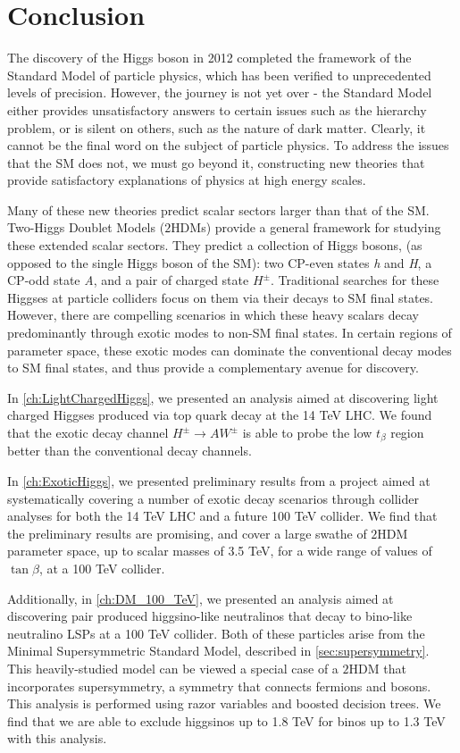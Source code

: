 \chapter{Conclusion}\label{ch:Conclusion}
The discovery of the Higgs boson in 2012 completed the framework of the Standard Model of particle physics, which has been verified to unprecedented levels of precision. However, the journey is not yet over - the Standard Model either provides unsatisfactory answers to certain issues such as the hierarchy problem, or is silent on others, such as the nature of dark matter. Clearly, it cannot be the final word on the subject of particle physics. To address the issues that the SM does not, we must go beyond it, constructing new theories that provide satisfactory explanations of physics at high energy scales. 

Many of these new theories predict scalar sectors larger than that of the SM. Two-Higgs Doublet Models ($2$HDMs) provide a general framework for studying these extended scalar sectors. They predict a collection of Higgs bosons, (as opposed to the single Higgs boson of the SM): two CP-even states \emph{h} and \emph{H}, a CP-odd state \emph{A}, and a pair of charged state $H^\pm$.
Traditional searches for these Higgses at particle colliders focus on them via their decays to SM final states. However, there are compelling scenarios in which these heavy scalars decay predominantly through exotic modes to non-SM final states. In certain regions of parameter space, these exotic modes can dominate the conventional decay modes to SM final states, and thus provide a complementary avenue for discovery. 

In \autoref{ch:LightChargedHiggs}, we presented an analysis aimed at discovering light charged Higgses produced via top quark decay at the 14 TeV LHC. We found that the exotic decay channel $H^\pm\rightarrow AW^\pm$ is able to probe the low $t_\beta$ region better than the conventional decay channels.

In \autoref{ch:ExoticHiggs}, we presented preliminary results from a project aimed at systematically covering a number of exotic decay scenarios through collider analyses for both the 14 TeV LHC and a future 100 TeV collider. We find that the preliminary results are promising, and cover a large swathe of $2$HDM parameter space, up to scalar masses of 3.5 TeV, for a wide range of values of $\tan\beta$, at a 100 TeV collider.

Additionally, in \autoref{ch:DM_100_TeV}, we presented an analysis aimed at discovering pair produced higgsino-like neutralinos that decay to bino-like neutralino LSPs at a 100 TeV collider. Both of these particles arise from the Minimal Supersymmetric Standard Model, described in \autoref{sec:supersymmetry}. This heavily-studied model can be viewed a special case of a $2$HDM that incorporates supersymmetry, a symmetry that connects fermions and bosons. This analysis is performed using razor variables and boosted decision trees. We find that we are able to exclude higgsinos up to 1.8 TeV for binos up to 1.3 TeV with this analysis.

